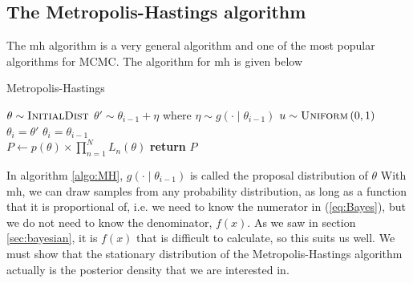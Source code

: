 \documentclass{article}
\theoremstyle{definition}
\begin{document}
\subsection{The Metropolis-Hastings algorithm}
The \gls{mh} algorithm is a very general algorithm and one of the most popular algorithms for MCMC. The algorithm for \gls{mh} is given below
\begin{algorithm}[H]\label{algo:MH}
    \caption{Metropolis-Hastings}
    \label{algo:MH}
    \begin{algorithmic}[1] %
        \State $\theta \sim \textsc{InitialDist}$ 
        \State$\theta' \sim \theta_{i-1} + \eta$ where $\eta\sim g\left(\cdot \mid \theta_{i-1}\right)$
        \State $u\sim \textsc{Uniform}\left(0,1\right)$
        \State $\theta_i = \theta'$
        \Else 
        \State $\theta_i = \theta_{i-1}$
         \EndIf
         \EndFor
         \\
            \State $P \gets p\left(\theta\right)\times \prod_{n=1}^N L_n\left(\theta\right)$
           \State \textbf{return} $P$
        \EndFunction
    \end{algorithmic}
\end{algorithm}
In algorithm \ref{algo:MH}, $g\left(\cdot \mid \theta_{i-1}\right)$ is called the proposal distribution of $\theta$
With \gls{mh}, we can draw samples from any probability distribution, as long as a function that it is proportional of, i.e. we need to know the numerator in (\ref{eq:Bayes}), but we do not need to know the denominator, $f\left(x\right)$. As we saw in section \ref{sec:bayesian}, it is $f\left(x\right)$ that is difficult to calculate, so this suits us well. 
We must show that the stationary distribution of the Metropolis-Hastings algorithm actually is the posterior density that we are interested in.
\end{document}
